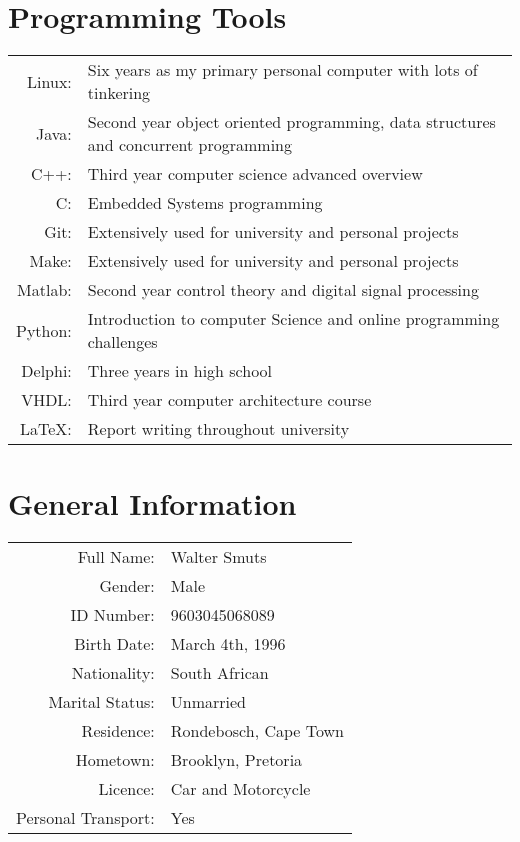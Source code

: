 \documentclass[twocolumn, 8pt]{extarticle}
\begin{document}
\newpage
\section{Programming Tools}
\begin{center}
\renewcommand{\arraystretch}{2}
\begin{tabular}{r p{5.7cm}}
	Linux: & Six years as my primary personal computer with lots of tinkering \\
	Java: & Second year object oriented programming,
	data structures and concurrent programming \\
	C++: & Third year computer science advanced overview \\
	C: & Embedded Systems programming \\
	Git: & Extensively used for university and personal projects \\
	Make: & Extensively used for university and personal projects \\
	Matlab: & Second year control theory and digital signal processing \\
	Python: & Introduction to computer Science and online programming challenges \\
	Delphi: & Three years in high school \\
	VHDL: & Third year computer architecture course \\
	\LaTeX: & Report writing throughout university \\
\end{tabular}
\end{center}

\section{General Information}

\begin{center}
\renewcommand{\arraystretch}{2}
\begin{tabular}{r l}
	Full Name: & Walter Smuts \\
	Gender: & Male \\
	ID Number: & 9603045068089 \\
	Birth Date: & March 4th, 1996 \\
	Nationality: & South African \\
	Marital Status: & Unmarried \\
	Residence: & Rondebosch, Cape Town \\
	Hometown: & Brooklyn, Pretoria \\
	Licence: & Car and Motorcycle \\
	Personal Transport: & Yes \\
\end{tabular}
\end{center}
\end{document}
